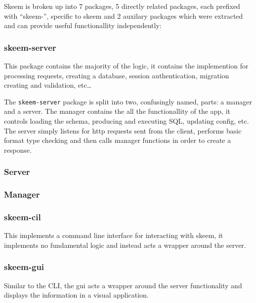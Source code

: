 \documentclass[
  12pt,
]{article}
\newcommand{\passthrough}[1]{#1}
\begin{document}
Skeem is broken up into 7 packages, 5 directly related packages, each
prefixed with ``skeem-'', specific to skeem and 2 auxilary packages
which were extracted and can provide useful functionallity
independently:

\hypertarget{skeem-server}{%
\subsubsection{skeem-server}\label{skeem-server}}

This package contains the majority of the logic, it contains the
implemention for processing requests, creating a database, session
authentication, migration creating and validation, etc\ldots{}

The \passthrough{\lstinline!skeem-server!} package is split into two,
confusingly named, parts: a manager and a server. The manager contains
the all the functionallity of the app, it controls loading the schema,
producing and executing SQL, updating config, etc. The server simply
listens for http requests sent from the client, performs basic format
type checking and then calls manager functions in order to create a
response.

\hypertarget{server}{%
\subsubsection{Server}\label{server}}

\hypertarget{manager}{%
\subsubsection{Manager}\label{manager}}

\hypertarget{skeem-cil}{%
\subsubsection{skeem-cil}\label{skeem-cil}}

This implements a command line interface for interacting with skeem, it
implements no fundamental logic and instead acts a wrapper around the
server.

\hypertarget{skeem-gui}{%
\subsubsection{skeem-gui}\label{skeem-gui}}

Similar to the CLI, the gui acts a wrapper around the server
functionality and displays the information in a visual application.
\end{document}
